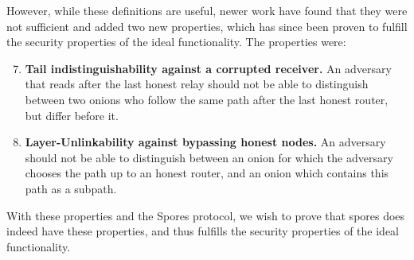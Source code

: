 However, while these definitions are useful, newer work have found
that they were not sufficient and added two new properties, which has
since been proven to fulfill the security properties of the ideal
functionality. The properties were:

\begin{enumerate}
  \setcounter{enumi}{6}
  \item{{\bf Tail indistinguishability against a corrupted receiver.}
    An adversary that reads after the last honest relay should not be
    able to distinguish between two onions who follow the same path
    after the last honest router, but differ before it.}

  \item{{\bf Layer-Unlinkability against bypassing honest nodes.} An
    adversary should not be able to distinguish between an onion for
    which the adversary chooses the path up to an honest router, and
    an onion which contains this path as a subpath.}
\end{enumerate}

With these properties and the Spores protocol, we wish to prove that
spores does indeed have these properties, and thus fulfills the
security properties of the ideal functionality. 

